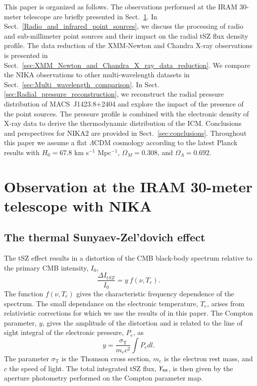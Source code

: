 \documentclass[twocolumn,traditabstract]{aa}
\begin{document}
This paper is organized as follows. The observations performed at the IRAM 30-meter telescope are briefly presented in Sect.~\ref{sec:Observation_at_the_IRAM_30m_telescope_with_NIKA}. In Sect.~\ref{Radio_and_infrared_point_sources}, we discuss the processing of radio and sub-millimeter point sources and their impact on the radial tSZ flux density profile. The data reduction of the XMM-Newton and Chandra X-ray observations is presented in Sect.~\ref{sec:XMM_Newton_and_Chandra_X_ray_data_reduction}. We compare the NIKA observations to other multi-wavelength datasets in Sect.~\ref{sec:Multi_wavelength_comparison}. In Sect. \ref{sec:Radial_pressure_reconstruction}, we reconstruct the radial pressure distribution of \mbox{MACS~J1423.8+2404} and explore the impact of the presence of the point sources. The pressure profile is combined with the electronic density of X-ray data to derive the thermodynamic distribution of the ICM. Conclusions and perspectives for NIKA2 are provided in Sect.~\ref{sec:conclusions}. Throughout this paper we assume a flat $\Lambda$CDM cosmology according to the latest Planck results \citep{planck2014param} with $H_0 = 67.8$ km s$^{-1}$ Mpc$^{-1}$, $\Omega_M = 0.308$, and $\Omega_{\Lambda} = 0.692$.

\section{Observation at the IRAM 30-meter telescope with NIKA}\label{sec:Observation_at_the_IRAM_30m_telescope_with_NIKA}
\subsection{The thermal Sunyaev-Zel'dovich effect}
The tSZ effect \citep{sunyaev1972,sunyaev1980} results in a distortion of the CMB black-body spectrum relative to the primary CMB intensity, $I_0$, \citep[e.g.][]{birkinshaw1999}
\begin{equation}
	\frac{\Delta I_{tSZ}}{I_0} = y \ f(\nu, T_e).
\label{eq:deltaI}
\end{equation}
The function $f(\nu, T_e)$ gives the characteristic frequency dependence of the spectrum. The small dependance on the electronic temperature, $T_e$, arises from relativistic corrections for which we use the results of \cite{itoh1998} in this paper. The Compton parameter, $y$, gives the amplitude of the distortion and is related to the line of sight integral of the electronic pressure, $P_e$, as 
\begin{equation}
	y = \frac{\sigma_{\mathrm{T}}}{m_{e} c^2} \int P_{e} dl.
	\label{eq:y_compton}
\end{equation}
The parameter $\sigma_{\mathrm{T}}$ is the Thomson cross section, $m_{e}$ is the electron rest mass, and $c$ the speed of light. The total integrated tSZ flux, $Y_{\rm tot}$, is then given by the aperture photometry performed on the Compton parameter map.
\end{document}
